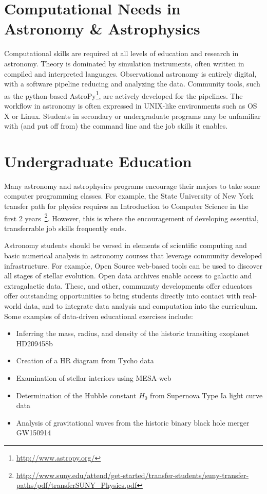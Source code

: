 \documentclass[11pt]{article}
\newenvironment{squishlist}                                                     
  {\begin{itemize}                                                              
    \addtolength{\itemsep}{-0.33\baselineskip}                                  
   }                                                                            
  { \end{itemize} }
\begin{document}
\section{Computational Needs in Astronomy \& Astrophysics}

Computational skills are required at all levels of education
and research in astronomy.  Theory is dominated by simulation instruments, 
often written in compiled and interpreted languages. 
Observational astronomy is entirely digital, with 
a software pipeline reducing and analyzing the data.  Community tools, such as the python-based
AstroPy\footnote{\url{http://www.astropy.org/}}, are actively developed for the pipelines.
The workflow in astronomy is often expressed in UNIX-like environments such as  OS X or Linux.
Students in secondary or undergraduate programs may be unfamiliar with
(and put off from) the command line and the job skills it enables.

\section{Undergraduate Education}

Many astronomy and astrophysics programs encourage their majors to
take some computer programming classes.  For example, the State
University of New York transfer path for physics requires an Introduction to Computer Science 
in the first 2
years~\footnote{\url{http://www.suny.edu/attend/get-started/transfer-students/suny-transfer-paths/pdf/transferSUNY_Physics.pdf}\hfill}.
However, this is where the encouragement of developing essential, transferrable job skills frequently ends. 

Astronomy students should be versed in elements of scientific computing and
basic numerical analysis in astronomy courses that leverage
community developed infrastructure. For example, Open Source web-based tools can 
be used to discover all stages of stellar evolution. Open data archives enable access to
galactic and extragalactic data.  These, and other, communuty
developments offer educators offer outstanding opportunities to bring
students directly into contact with real-world data, and to integrate
data analysis and computation into the curriculum. Some examples of
data-driven educational exercises include:
\begin {squishlist}
\item Inferring the mass, radius, and density of the historic transiting exoplanet HD209458b
\item Creation of a HR diagram from Tycho data
\item Examination of stellar interiors using MESA-web
\item Determination of the Hubble constant $H_0$ from Supernova Type Ia light curve data
\item Analysis of gravitational waves from the historic binary black hole merger GW150914
\end {squishlist}
\end{document}
